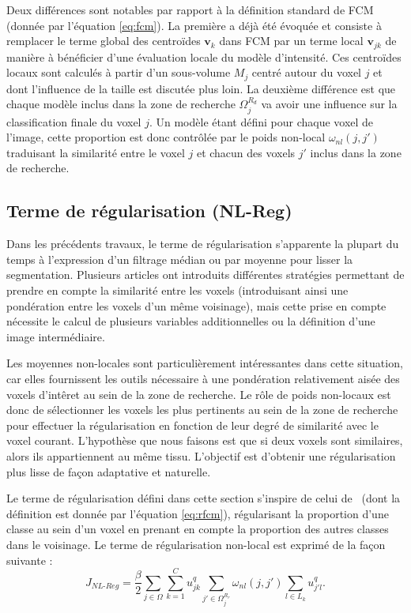 Deux différences sont notables par rapport à la définition standard de FCM (donnée par l'équation \ref{eq:fcm}).
La première a déjà été évoquée et consiste à remplacer le terme global des centroïdes $\mathbf{v}_{k}$ dans FCM par un terme local $\mathbf{v}_{jk}$ de manière à bénéficier d'une évaluation locale du modèle d'intensité.
Ces centroïdes locaux sont calculés à partir d'un sous-volume $M_j$ centré autour du voxel $j$ et dont l'influence de la taille est discutée plus loin.
La deuxième différence est que chaque modèle inclus dans la zone de recherche $\Omega^{R_d}_{j}$ va avoir une influence sur la classification finale du voxel $j$.
Un modèle étant défini pour chaque voxel de l'image, cette proportion est donc contrôlée par le poids non-local $\omega_{nl}(j,j')$ traduisant la similarité entre le voxel $j$ et chacun des voxels $j'$ inclus dans la zone de recherche.  

\subsection{Terme de régularisation (NL-Reg)}
\label{subsec:nl:reg}

Dans les précédents travaux, le terme de régularisation s'apparente la plupart du temps à l'expression d'un filtrage médian ou par moyenne pour lisser la segmentation.
Plusieurs articles ont introduits différentes stratégies permettant de prendre en compte la similarité entre les voxels (introduisant ainsi une pondération entre les voxels d'un même voisinage), mais cette prise en compte nécessite le calcul de plusieurs variables additionnelles ou la définition d'une image intermédiaire.

Les moyennes non-locales sont particulièrement intéressantes dans cette situation, car elles fournissent les outils nécessaire à une pondération relativement aisée des voxels d'intêret au sein de la zone de recherche.
Le rôle de poids non-locaux est donc de sélectionner les voxels les plus pertinents au sein de la zone de recherche pour effectuer la régularisation en fonction de leur degré de similarité avec le voxel courant.
L'hypothèse que nous faisons est que si deux voxels sont similaires, alors ils appartiennent au même tissu.
L'objectif est d'obtenir une régularisation plus lisse de façon adaptative et naturelle.

Le terme de régularisation défini dans cette section s'inspire de celui de~\cite{Pham:CVIU:2001} (dont la définition est donnée par l'équation \ref{eq:rfcm}), régularisant la proportion d'une classe au sein d'un voxel en prenant en compte la proportion des autres classes dans le voisinage.
Le terme de régularisation non-local est exprimé de la façon suivante :
\begin{equation}
J_{NL\textrm{-}Reg} =
\frac{\beta}{2} \sum_{j \in \Omega} \sum_{k=1}^{C} u_{jk}^{q} \sum_{j' \in \Omega^{R_{r}}_{j}} \omega_{nl}(j, j') \sum_{l \in L_{k}} u_{j'l}^{q} \label{eq:nlfcm:reg}.
\end{equation}


